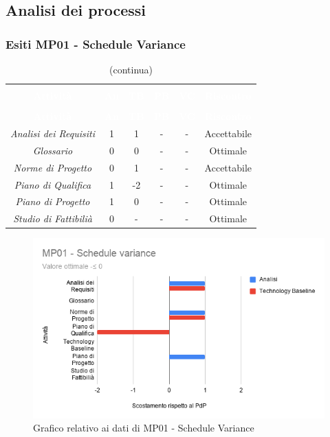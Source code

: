\subsection{Analisi dei processi}
\subsubsection{Esiti MP01 - Schedule Variance} 
\begin{longtable}{c c c c c c}
\rowcolor{white}\caption{Esiti verifica Schedule Variance} \\
		\rowcolor{redafk}
\textcolor{white}{\textbf{Attività}} &
\textcolor{white}{\textbf{An}} &
\textcolor{white}{\textbf{TB}} &
\textcolor{white}{\textbf{PB}} &
\textcolor{white}{\textbf{VC}} &
\textcolor{white}{\textbf{Riscontro}} \\
		\endfirsthead
		\rowcolor{white}\caption[]{(continua)} \\
		\rowcolor{redafk}
\textcolor{white}{\textbf{Attività}} &
\textcolor{white}{\textbf{An}} &
\textcolor{white}{\textbf{TB}} &
\textcolor{white}{\textbf{PB}} &
\textcolor{white}{\textbf{VC}} &
\textcolor{white}{\textbf{Riscontro}} \\
		\endhead
\textit{Analisi dei Requisiti} & 
1 &
1 &
- &
- &
Accettabile \\
\textit{Glossario} & 
0 &
0 &
- &
- &
Ottimale \\
\textit{Norme di Progetto} & 
0 &
1 &
- &
- &
Accettabile \\
\textit{Piano di Qualifica} & 
1 &
-2 &
- &
- &
Ottimale \\
\textit{Piano di Progetto} & 
1 &
0 &
- &
- &
Ottimale \\
\textit{Studio di Fattibilià} & 
0 &
- &
- &
- &
Ottimale \\
\end{longtable}

\begin{figure}[H]
\centering
\includegraphics[scale=0.6]{./img/MP01_schedule_variance.png}
\caption{Grafico relativo ai dati di MP01 - Schedule Variance}
\end{figure}

